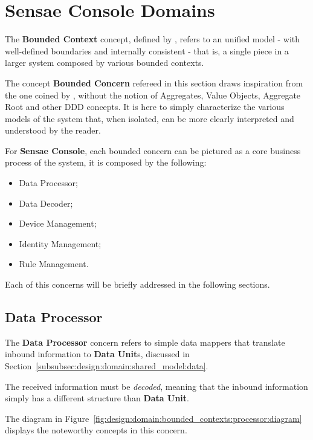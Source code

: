 
\chapter{Sensae Console Domains}
\label{appendix:design:domain:bounded_contexts}

The \textbf{Bounded Context} concept, defined by \cite{evans2014domain}, refers to an unified model - with well-defined boundaries and internally consistent - that is, a single piece in a larger system composed by various bounded contexts.

The concept \textbf{Bounded Concern} refereed in this section draws inspiration from the one coined by \cite{evans2014domain}, without the notion of Aggregates, Value Objects, Aggregate Root and other \gls{DDD} concepts. It is here to simply characterize the various models of the system that, when isolated, can be more clearly interpreted and understood by the reader.

For \textbf{Sensae Console}, each bounded concern can be pictured as a core business process of the system, it is composed by the following:

\begin{itemize}
   \item Data Processor;
   \item Data Decoder;
   \item Device Management;
   \item Identity Management;
   \item Rule Management.
\end{itemize}

Each of this concerns will be briefly addressed in the following sections.

\section{Data Processor}
\label{subsubsec:design:domain:bounded_contexts:processor}

The \textbf{Data Processor} concern refers to simple data mappers that translate inbound information to \textbf{Data Unit}s, discussed in Section~\ref{subsubsec:design:domain:shared_model:data}.

The received information must be \textit{decoded}, meaning that the inbound information simply has a different structure than \textbf{Data Unit}.

The diagram in Figure~\ref{fig:design:domain:bounded_contexts:processor:diagram} displays the noteworthy concepts in this concern.

